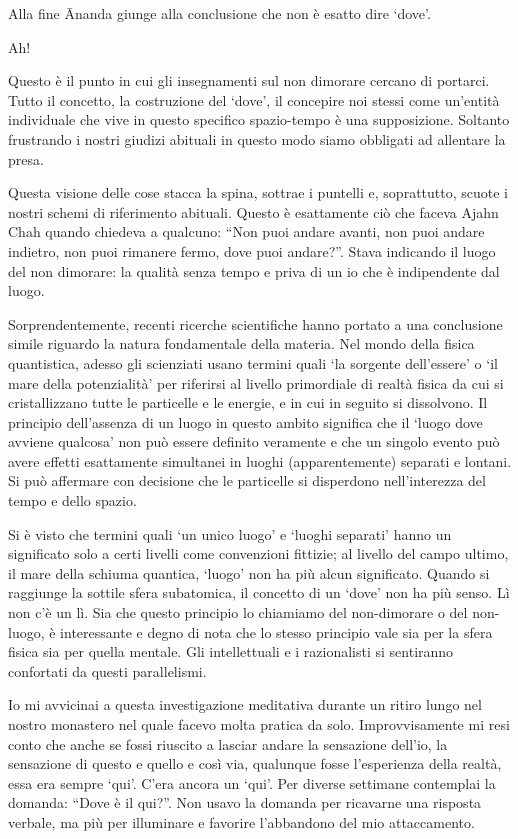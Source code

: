Alla fine \=Ananda giunge alla conclusione che non è esatto dire `dove'.

Ah!

Questo è il punto in cui gli insegnamenti sul non dimorare cercano di portarci. Tutto il concetto, la costruzione del `dove', il concepire noi stessi come un'entità individuale che vive in questo specifico spazio-tempo è una supposizione. Soltanto frustrando i nostri giudizi abituali in questo modo siamo obbligati ad allentare la presa.

Questa visione delle cose stacca la spina, sottrae i puntelli e, soprattutto, scuote i nostri schemi di riferimento abituali. Questo è esattamente ciò che faceva Ajahn Chah quando chiedeva a qualcuno: ``Non puoi andare avanti, non puoi andare indietro, non puoi rimanere fermo, dove puoi andare?''. Stava indicando il luogo del non dimorare: la qualità senza tempo e priva di un io che è indipendente dal luogo. 

Sorprendentemente, recenti ricerche scientifiche hanno portato a una conclusione simile riguardo la natura fondamentale della materia. Nel mondo della fisica quantistica, adesso gli scienziati usano termini quali `la sorgente dell'essere' o `il mare della potenzialità' per riferirsi al livello primordiale di realtà fisica da cui si cristallizzano tutte le particelle e le energie, e in cui in seguito si dissolvono. Il principio dell'assenza di un luogo in questo ambito significa che il `luogo dove avviene qualcosa' non può essere definito veramente e che un singolo evento può avere effetti esattamente simultanei in luoghi (apparentemente) separati e lontani. Si può affermare con decisione che le particelle si disperdono nell'interezza del tempo e dello spazio.

Si è visto che termini quali `un unico luogo' e `luoghi separati' hanno un significato solo a certi livelli come convenzioni fittizie; al livello del campo ultimo, il mare della schiuma quantica, `luogo' non ha più alcun significato. Quando si raggiunge la sottile sfera subatomica, il concetto di un `dove' non ha più senso. Lì non c'è un lì. Sia che questo principio lo chiamiamo del non-dimorare o del non-luogo, è interessante e degno di nota che lo stesso principio vale sia per la sfera fisica sia per quella mentale. Gli intellettuali e i razionalisti si sentiranno confortati da questi parallelismi. 

Io mi avvicinai a questa investigazione meditativa durante un ritiro lungo nel nostro monastero nel quale facevo molta pratica da solo. Improvvisamente mi resi conto che anche se fossi riuscito a lasciar andare la sensazione dell'io, la sensazione di questo e quello e così via, qualunque fosse l'esperienza della realtà, essa era sempre `qui'. C'era ancora un `qui'. Per diverse settimane contemplai la domanda: ``Dove è il qui?''. Non usavo la domanda per ricavarne una risposta verbale, ma più per illuminare e favorire l'abbandono del mio attaccamento.

